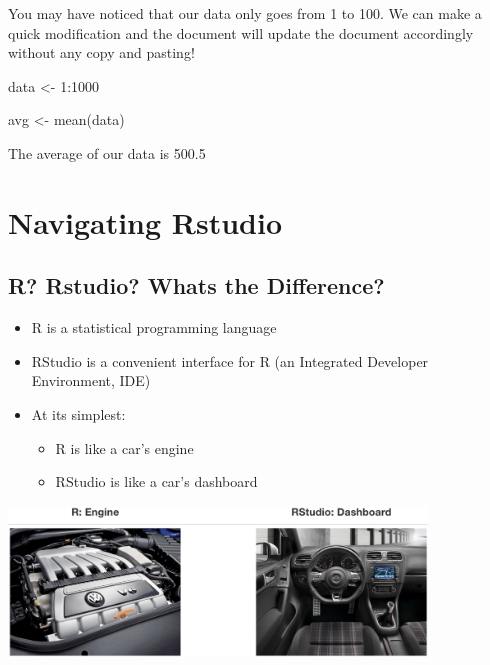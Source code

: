 \documentclass[
  letterpaper,
  DIV=11,
  numbers=noendperiod,
  oneside]{scrreprt}
\newenvironment{Shaded}{\begin{snugshade}}{\end{snugshade}}
\newcommand{\DecValTok}[1]{\textcolor[rgb]{0.68,0.00,0.00}{#1}}
\newcommand{\FunctionTok}[1]{\textcolor[rgb]{0.28,0.35,0.67}{#1}}
\newcommand{\NormalTok}[1]{\textcolor[rgb]{0.00,0.23,0.31}{#1}}
\newcommand{\OtherTok}[1]{\textcolor[rgb]{0.00,0.23,0.31}{#1}}
\newcommand{\SpecialCharTok}[1]{\textcolor[rgb]{0.37,0.37,0.37}{#1}}
\providecommand{\tightlist}{%
  \setlength{\itemsep}{0pt}\setlength{\parskip}{0pt}}\usepackage{longtable,booktabs,array}
\begin{document}
You may have noticed that our data only goes from 1 to 100. We can make
a quick modification and the document will update the document
accordingly without any copy and pasting!

\begin{Shaded}
\begin{Highlighting}[]
\NormalTok{data }\OtherTok{\textless{}{-}} \DecValTok{1}\SpecialCharTok{:}\DecValTok{1000}

\NormalTok{avg }\OtherTok{\textless{}{-}} \FunctionTok{mean}\NormalTok{(data)}
\end{Highlighting}
\end{Shaded}

The average of our data is 500.5

\hypertarget{navigating-rstudio}{%
\section{Navigating Rstudio}\label{navigating-rstudio}}

\hypertarget{r-rstudio-whats-the-difference}{%
\subsection{R? Rstudio? Whats the
Difference?}\label{r-rstudio-whats-the-difference}}

\begin{itemize}
\tightlist
\item
  R is a statistical programming language
\item
  RStudio is a convenient interface for R (an Integrated Developer
  Environment, IDE)
\item
  At its simplest:

  \begin{itemize}
  \tightlist
  \item
    R is like a car's engine
  \item
    RStudio is like a car's dashboard
  \end{itemize}
\end{itemize}

\includegraphics[width=4.38in,height=\textheight]{pics/engine-dashboard.png}
\end{document}
